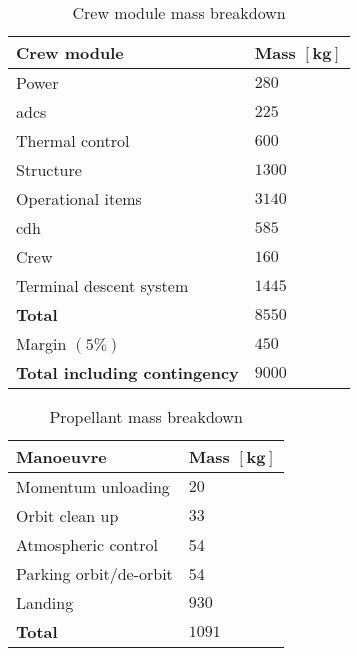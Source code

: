 \begin{table}[H]
	\centering
	\caption{Crew module mass breakdown}
	\label{tab:CrewModuleMass}
	\begin{tabular}{|p{}|p{}|} \hline
		\textbf {Crew module}             & \textbf{Mass $\mathbf{[kg]}$ } \\ \hline \hline
		Power        &		 $280$       \\ \hline
		\gls{adcs} &		  $225$      \\ \hline
		Thermal control & $600$\\ \hline
		Structure & $1300$\\ \hline
		Operational items & $3140$\\ \hline
		\acrlong{cdh} & $585$ \\ \hline
		Crew & $160$ \\ \hline
		Terminal descent system           		   &  $1445$      \\ \hline \hline
		\textbf{Total}             	   &  $8550$    \\ \hline
		Margin $\left(5\%\right)$ & $450$							\\ \hline
		\textbf {Total including contingency}                 &  $9000$     \\ \hline
	\end{tabular}
\end{table}

\begin{table}[H]
	\centering
	\caption{Propellant mass breakdown}
	\label{tab:PropMass}
	\begin{tabular}{|p{}|p{}|} \hline
		\textbf {Manoeuvre}             & \textbf{Mass $\mathbf{[kg]}$ } \\ \hline \hline
		Momentum unloading       &		 $20$       \\ \hline
		Orbit clean up &		 $33$      \\ \hline
		Atmospheric control           		   &  54      \\ \hline 
		Parking orbit/de-orbit            	   & 54    \\ \hline
		Landing            	   &  $930$     \\ \hline \hline
		\textbf {Total}                 &  $1091$      \\ \hline
	\end{tabular}
\end{table}
